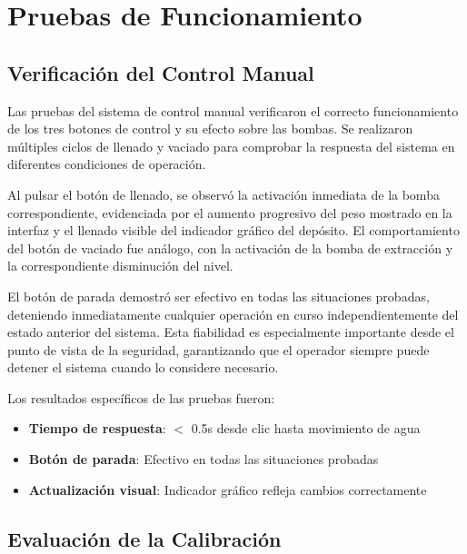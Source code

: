 \documentclass[12pt,a4paper]{article}
\begin{document}
\section{Pruebas de Funcionamiento}

\subsection{Verificación del Control Manual}

Las pruebas del sistema de control manual verificaron el correcto funcionamiento de los tres botones de control y su efecto sobre las bombas. Se realizaron múltiples ciclos de llenado y vaciado para comprobar la respuesta del sistema en diferentes condiciones de operación.

Al pulsar el botón de llenado, se observó la activación inmediata de la bomba correspondiente, evidenciada por el aumento progresivo del peso mostrado en la interfaz y el llenado visible del indicador gráfico del depósito. El comportamiento del botón de vaciado fue análogo, con la activación de la bomba de extracción y la correspondiente disminución del nivel.

El botón de parada demostró ser efectivo en todas las situaciones probadas, deteniendo inmediatamente cualquier operación en curso independientemente del estado anterior del sistema. Esta fiabilidad es especialmente importante desde el punto de vista de la seguridad, garantizando que el operador siempre puede detener el sistema cuando lo considere necesario.

Los resultados específicos de las pruebas fueron:

\begin{itemize}
    \item \textbf{Tiempo de respuesta}: $<$ 0.5s desde clic hasta movimiento de agua
    \item \textbf{Botón de parada}: Efectivo en todas las situaciones probadas
    \item \textbf{Actualización visual}: Indicador gráfico refleja cambios correctamente
\end{itemize}

\subsection{Evaluación de la Calibración}
\end{document}
